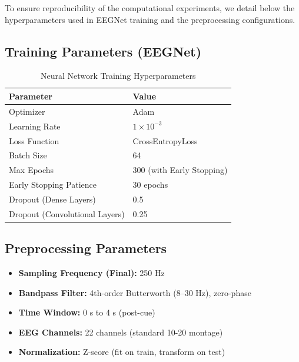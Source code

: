 \documentclass[conference]{IEEEtran}
\begin{document}
To ensure reproducibility of the computational experiments, we detail below the hyperparameters used in EEGNet training and the preprocessing configurations.

\subsection{Training Parameters (EEGNet)}

\begin{table}[!t]
    \centering
    \caption{Neural Network Training Hyperparameters}
    \begin{tabular}{ll}
        \toprule
        \textbf{Parameter} & \textbf{Value} \\
        \midrule
        Optimizer & Adam \\
        Learning Rate & $1 \times 10^{-3}$ \\
        Loss Function & CrossEntropyLoss \\
        Batch Size & 64 \\
        Max Epochs & 300 (with Early Stopping) \\
        Early Stopping Patience & 30 epochs \\
        Dropout (Dense Layers) & 0.5 \\
        Dropout (Convolutional Layers) & 0.25 \\
        \bottomrule
    \end{tabular}
\end{table}

\subsection{Preprocessing Parameters}

\begin{itemize}
    \item \textbf{Sampling Frequency (Final):} 250 Hz
    \item \textbf{Bandpass Filter:} 4th-order Butterworth (8--30 Hz), zero-phase
    \item \textbf{Time Window:} 0 s to 4 s (post-cue)
    \item \textbf{EEG Channels:} 22 channels (standard 10-20 montage)
    \item \textbf{Normalization:} Z-score (fit on train, transform on test)
\end{itemize}
\end{document}
